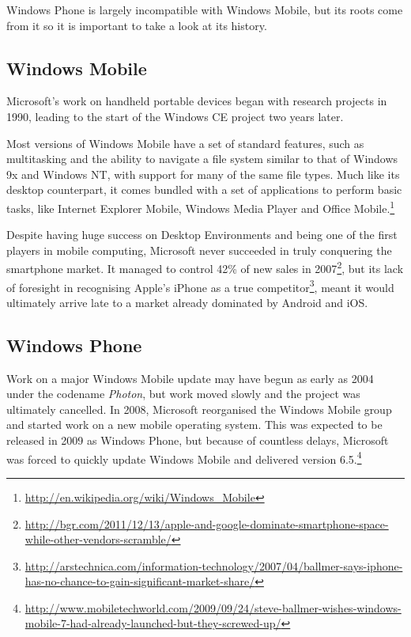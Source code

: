 Windows Phone is largely incompatible with Windows Mobile, but its roots come from it so it is important to take a look at its history.
\subsection{Windows Mobile}
Microsoft's work on handheld portable devices began with research projects in 1990, leading to the start of the Windows CE project two years later.

Most versions of Windows Mobile have a set of standard features, such as multitasking and the ability to navigate a file system similar to that of Windows 9x and Windows NT, with support for many of the same file types. Much like its desktop counterpart, it comes bundled with a set of applications to perform basic tasks, like Internet Explorer Mobile, Windows Media Player and Office Mobile.\footnote{\url{http://en.wikipedia.org/wiki/Windows_Mobile}}

Despite having huge success on Desktop Environments and being one of the first players in mobile computing, Microsoft never succeeded in truly conquering the smartphone market. It managed to control 42\% of new sales in 2007\footnote{\url{http://bgr.com/2011/12/13/apple-and-google-dominate-smartphone-space-while-other-vendors-scramble/}}, but its lack of foresight in recognising Apple's iPhone as a true competitor\footnote{\url{http://arstechnica.com/information-technology/2007/04/ballmer-says-iphone-has-no-chance-to-gain-significant-market-share/}}, meant it would ultimately arrive late to a market already dominated by Android and iOS.


\subsection{Windows Phone}
Work on a major Windows Mobile update may have begun as early as 2004 under the codename \textit{Photon}, but work moved slowly and the project was ultimately cancelled. In 2008, Microsoft reorganised the Windows Mobile group and started work on a new mobile operating system. This was expected to be released in 2009 as Windows Phone, but because of countless delays, Microsoft was forced to quickly update Windows Mobile and delivered version 6.5.\footnote{\url{http://www.mobiletechworld.com/2009/09/24/steve-ballmer-wishes-windows-mobile-7-had-already-launched-but-they-screwed-up/}} 

